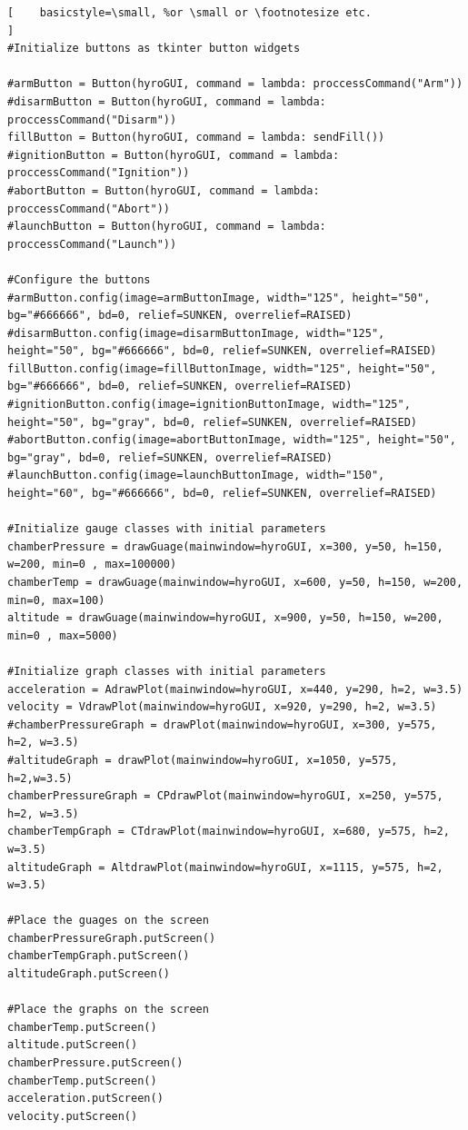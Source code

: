 \documentclass[10pt,draftclsnofoot,onecolumn,retainorgcmds]{IEEEtran}
\begin{document}
\begin{lstlisting}[    basicstyle=\small, %or \small or \footnotesize etc.
]
#Initialize buttons as tkinter button widgets

#armButton = Button(hyroGUI, command = lambda: proccessCommand("Arm"))
#disarmButton = Button(hyroGUI, command = lambda: proccessCommand("Disarm"))
fillButton = Button(hyroGUI, command = lambda: sendFill())
#ignitionButton = Button(hyroGUI, command = lambda: proccessCommand("Ignition"))
#abortButton = Button(hyroGUI, command = lambda: proccessCommand("Abort"))
#launchButton = Button(hyroGUI, command = lambda: proccessCommand("Launch"))

#Configure the buttons
#armButton.config(image=armButtonImage, width="125", height="50", bg="#666666", bd=0, relief=SUNKEN, overrelief=RAISED)
#disarmButton.config(image=disarmButtonImage, width="125", height="50", bg="#666666", bd=0, relief=SUNKEN, overrelief=RAISED)
fillButton.config(image=fillButtonImage, width="125", height="50", bg="#666666", bd=0, relief=SUNKEN, overrelief=RAISED)
#ignitionButton.config(image=ignitionButtonImage, width="125", height="50", bg="gray", bd=0, relief=SUNKEN, overrelief=RAISED)
#abortButton.config(image=abortButtonImage, width="125", height="50", bg="gray", bd=0, relief=SUNKEN, overrelief=RAISED)
#launchButton.config(image=launchButtonImage, width="150", height="60", bg="#666666", bd=0, relief=SUNKEN, overrelief=RAISED)

#Initialize gauge classes with initial parameters
chamberPressure = drawGuage(mainwindow=hyroGUI, x=300, y=50, h=150, w=200, min=0 , max=100000)
chamberTemp = drawGuage(mainwindow=hyroGUI, x=600, y=50, h=150, w=200, min=0, max=100)
altitude = drawGuage(mainwindow=hyroGUI, x=900, y=50, h=150, w=200, min=0 , max=5000)

#Initialize graph classes with initial parameters
acceleration = AdrawPlot(mainwindow=hyroGUI, x=440, y=290, h=2, w=3.5)
velocity = VdrawPlot(mainwindow=hyroGUI, x=920, y=290, h=2, w=3.5)
#chamberPressureGraph = drawPlot(mainwindow=hyroGUI, x=300, y=575, h=2, w=3.5)
#altitudeGraph = drawPlot(mainwindow=hyroGUI, x=1050, y=575, h=2,w=3.5)
chamberPressureGraph = CPdrawPlot(mainwindow=hyroGUI, x=250, y=575, h=2, w=3.5)
chamberTempGraph = CTdrawPlot(mainwindow=hyroGUI, x=680, y=575, h=2, w=3.5)
altitudeGraph = AltdrawPlot(mainwindow=hyroGUI, x=1115, y=575, h=2, w=3.5)

#Place the guages on the screen
chamberPressureGraph.putScreen()
chamberTempGraph.putScreen()
altitudeGraph.putScreen()

#Place the graphs on the screen
chamberTemp.putScreen()
altitude.putScreen()
chamberPressure.putScreen()
chamberTemp.putScreen()
acceleration.putScreen()
velocity.putScreen()


\end{lstlisting}
\end{document}
